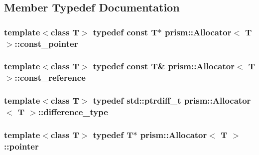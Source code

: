 \subsection{Member Typedef Documentation}
\subsubsection[{\texorpdfstring{const\+\_\+pointer}{const_pointer}}]{\setlength{\rightskip}{0pt plus 5cm}template$<$class T$>$ typedef const T$\ast$ {\bf prism\+::\+Allocator}$<$ T $>$\+::{\bf const\+\_\+pointer}}\hypertarget{classprism_1_1_allocator_af6a4a91dfc203203ecc319a457ce4dce}{}\label{classprism_1_1_allocator_af6a4a91dfc203203ecc319a457ce4dce}
\subsubsection[{\texorpdfstring{const\+\_\+reference}{const_reference}}]{\setlength{\rightskip}{0pt plus 5cm}template$<$class T$>$ typedef const T\& {\bf prism\+::\+Allocator}$<$ T $>$\+::{\bf const\+\_\+reference}}\hypertarget{classprism_1_1_allocator_a89911899c97ae877a81b798957a2d899}{}\label{classprism_1_1_allocator_a89911899c97ae877a81b798957a2d899}
\subsubsection[{\texorpdfstring{difference\+\_\+type}{difference_type}}]{\setlength{\rightskip}{0pt plus 5cm}template$<$class T$>$ typedef std\+::ptrdiff\+\_\+t {\bf prism\+::\+Allocator}$<$ T $>$\+::{\bf difference\+\_\+type}}\hypertarget{classprism_1_1_allocator_a39ca38c4c741bbc51d3c6e26603102ef}{}\label{classprism_1_1_allocator_a39ca38c4c741bbc51d3c6e26603102ef}
\subsubsection[{\texorpdfstring{pointer}{pointer}}]{\setlength{\rightskip}{0pt plus 5cm}template$<$class T$>$ typedef T$\ast$ {\bf prism\+::\+Allocator}$<$ T $>$\+::{\bf pointer}}\hypertarget{classprism_1_1_allocator_ad3c6706a7243bd3ef489e16d34d5750f}{}\label{classprism_1_1_allocator_ad3c6706a7243bd3ef489e16d34d5750f}

